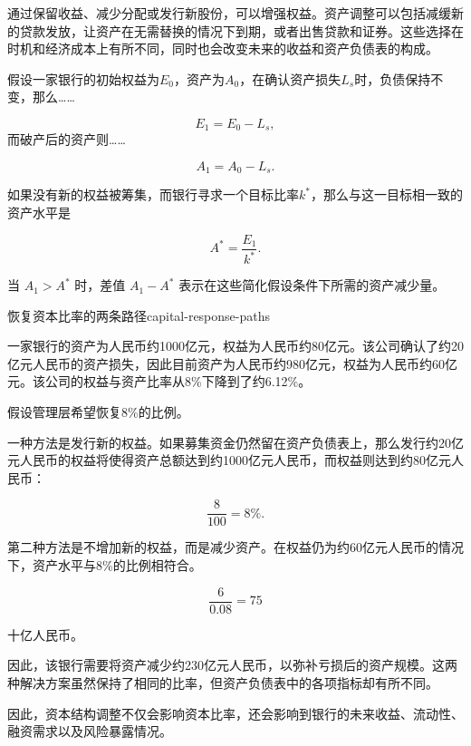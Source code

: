 通过保留收益、减少分配或发行新股份，可以增强权益。资产调整可以包括减缓新的贷款发放，让资产在无需替换的情况下到期，或者出售贷款和证券。这些选择在时机和经济成本上有所不同，同时也会改变未来的收益和资产负债表的构成。

假设一家银行的初始权益为$E_0$，资产为$A_0$，在确认资产损失$L_s$时，负债保持不变，那么……

\begin{equation}
E_1=E_0-L_s,
\label{eq:ch12-capital-after-loss}
\end{equation}
而破产后的资产则……

\begin{equation}
A_1=A_0-L_s.
\end{equation}

如果没有新的权益被筹集，而银行寻求一个目标比率$k^{*}$，那么与这一目标相一致的资产水平是

\begin{equation}
A^{*}=\frac{E_1}{k^{*}}.
\label{eq:ch12-assets-consistent-capital-ratio}
\end{equation}

当 $A_1 > A^{*}$ 时，差值 $A_1 - A^{*}$ 表示在这些简化假设条件下所需的资产减少量。

\begin{example}{恢复资本比率的两条路径}{capital-response-paths}

一家银行的资产为人民币约1000亿元，权益为人民币约80亿元。该公司确认了约20亿元人民币的资产损失，因此目前资产为人民币约980亿元，权益为人民币约60亿元。该公司的权益与资产比率从8\%下降到了约6.12\%。

假设管理层希望恢复8\%的比例。

一种方法是发行新的权益。如果募集资金仍然留在资产负债表上，那么发行约20亿元人民币的权益将使得资产总额达到约1000亿元人民币，而权益则达到约80亿元人民币：

\[
\frac{8}{100}=8\%.
\]

第二种方法是不增加新的权益，而是减少资产。在权益仍为约60亿元人民币的情况下，资产水平与8\%的比例相符合。

\[
\frac{6}{0.08}=75
\]

十亿人民币。

因此，该银行需要将资产减少约230亿元人民币，以弥补亏损后的资产规模。这两种解决方案虽然保持了相同的比率，但资产负债表中的各项指标却有所不同。

\end{example}

因此，资本结构调整不仅会影响资本比率，还会影响到银行的未来收益、流动性、融资需求以及风险暴露情况。


